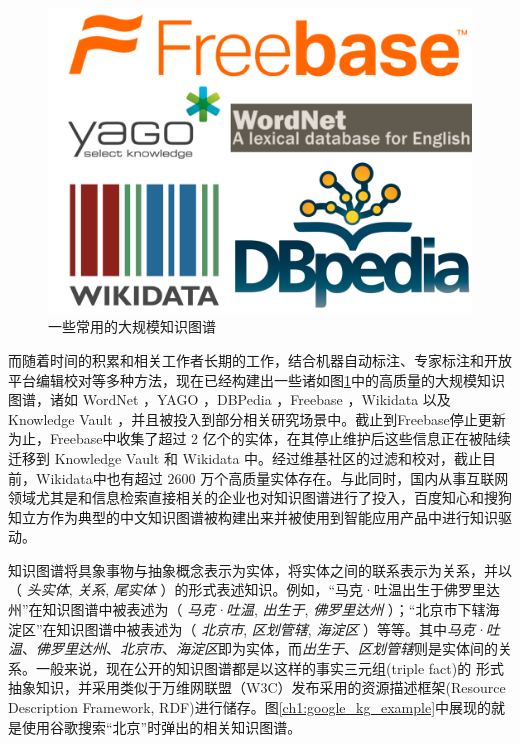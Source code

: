 \vspace{25pt}
\begin{figure}[!htbp]
\setlength{\abovecaptionskip}{30pt} 
\centering
\includegraphics[width=0.8\columnwidth]{figures/ch1/KG_example.png}
\caption{一些常用的大规模知识图谱}
\label{ch1:KG_example}
\end{figure}

而随着时间的积累和相关工作者长期的工作，结合机器自动标注、专家标注和开放平台编辑校对等多种方法，现在已经构建出一些诸如图\ref{ch1:KG_example}中的高质量的大规模知识图谱，诸如 WordNet \cite{miller1995wordnet}，YAGO \cite{hoffart2013yago2}，DBPedia \cite{auer2007dbpedia}，Freebase \cite{bollacker2008freebase}，Wikidata \cite{vrandevcic2014wikidata} 以及 Knowledge Vault \cite{dong2014knowledge}，并且被投入到部分相关研究场景中。截止到Freebase停止更新为止，Freebase中收集了超过 $2$ 亿个的实体，在其停止维护后这些信息正在被陆续迁移到 Knowledge Vault 和 Wikidata 中。经过维基社区的过滤和校对，截止目前，Wikidata中也有超过 $2600$ 万个高质量实体存在。与此同时，国内从事互联网领域尤其是和信息检索直接相关的企业也对知识图谱进行了投入，百度知心和搜狗知立方作为典型的中文知识图谱被构建出来并被使用到智能应用产品中进行知识驱动。

知识图谱将具象事物与抽象概念表示为实体，将实体之间的联系表示为关系，并以（ \emph{头实体}, \emph{关系}, \emph{尾实体} ）的形式表述知识。例如，“马克·吐温出生于佛罗里达州”在知识图谱中被表述为（ \emph{马克·吐温}, \emph{出生于}, \emph{佛罗里达州} ）；“北京市下辖海淀区”在知识图谱中被表述为（ \emph{北京市}, \emph{区划管辖}, \emph{海淀区} ）等等。其中\emph{马克·吐温}、\emph{佛罗里达州}、\emph{北京市}、\emph{海淀区}即为实体，而\emph{出生于}、\emph{区划管辖}则是实体间的关系。一般来说，现在公开的知识图谱都是以这样的事实三元组(triple fact)的 形式抽象知识，并采用类似于万维网联盟（W3C）发布采用的资源描述框架(Resource Description Framework, RDF)进行储存。图\ref{ch1:google_kg_example}中展现的就是使用谷歌搜索``北京''时弹出的相关知识图谱。

